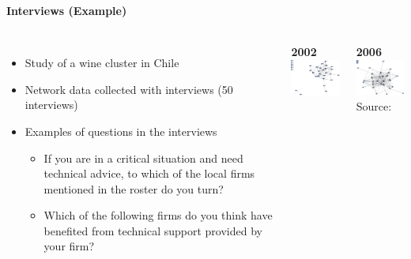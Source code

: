 \documentclass[8pt]{beamer}
\begin{document}
\begin{frame}
\frametitle{\insertsection}
\framesubtitle{Interviews (Example)}

\begin{columns}[c]

\begin{itemize}
\item Study of a wine cluster in Chile \citep{Giuliani2013}
\item Network data collected with interviews (50 interviews)
\item Examples of questions in the interviews
	\begin{itemize}
	\item If you are in a critical situation and need technical advice, to which of the local firms mentioned in the roster do you turn?
	\item Which of the following firms do you think have benefited from technical support provided by your firm?
	\end{itemize}
	
\end{itemize}

\centering
\textbf{2002}\\
\includegraphics[width=4cm]{wine1.jpg}\\

\medskip

\textbf{2006}\\
\includegraphics[width=4cm]{wine2.jpg}\\
\tiny{Source:\citet{Giuliani2013}}

\end{columns}

\end{frame}

\end{document}
